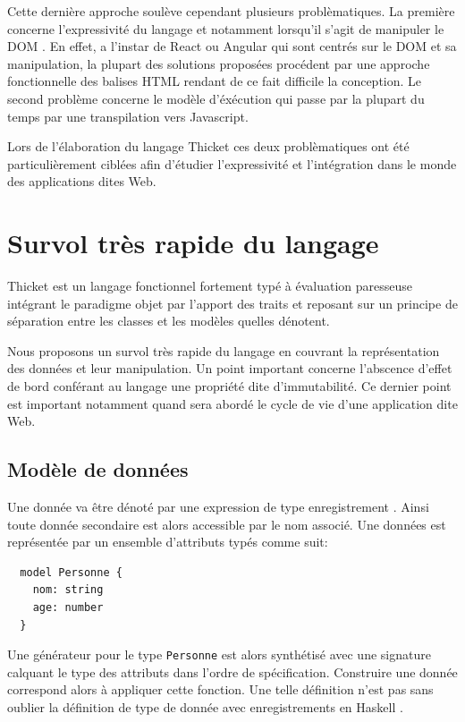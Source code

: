 \documentclass[twoside,a4paper]{article}
\begin{document}
Cette dernière approche soulève cependant plusieurs problèmatiques. La
première  concerne l'expressivité  du langage  et notamment  lorsqu'il
s'agit de manipuler  le DOM \cite{dom}. En effet, a  l'instar de React
\cite{reacjs} ou Angular  \cite{angular2} qui sont centrés  sur le DOM
et sa manipulation,  la plupart des solutions  proposées procédent par
une  approche  fonctionnelle  des  balises HTML  rendant  de  ce  fait
difficile  la  conception.  Le  second  problème  concerne  le  modèle
d'éxécution qui  passe par la  plupart du temps par  une transpilation
vers Javascript.

Lors de l'élaboration  du langage Thicket ces  deux problèmatiques ont
été   particulièrement  ciblées   afin  d'étudier   l'expressivité  et
l'intégration dans le monde des applications dites Web.

\section{Survol très rapide du langage}

Thicket  est  un  langage  fonctionnel  fortement  typé  à  évaluation
paresseuse  intégrant  le  paradigme  objet par  l'apport  des  traits
\cite{trait}  et reposant  sur  un principe  de  séparation entre  les
classes et les modèles quelles dénotent.

Nous  proposons  un survol  très  rapide  du  langage en  couvrant  la
représentation des  données et  leur manipulation. Un  point important
concerne l'abscence d'effet de bord conférant au langage une propriété
dite d'immutabilité.  Ce dernier  point est important  notamment quand
sera abordé le cycle de vie d'une application dite Web.

\subsection{Modèle de données}

Une donnée  va être dénoté  par une expression de  type enregistrement
\cite{recordcalculus}.   Ainsi  toute   donnée  secondaire  est  alors
accessible  par le  nom associé.  Une données  est représentée  par un
ensemble d'attributs typés comme suit:

\lstset{language=Thicket}
\begin{lstlisting}
  model Personne {  
    nom: string   
    age: number
  }
\end{lstlisting}

Une générateur pour  le type {\tt Personne} est  alors synthétisé avec
une  signature  calquant  le  type   des  attributs  dans  l'ordre  de
spécification.   Construire une  donnée correspond  alors à  appliquer
cette  fonction.  Une  telle  définition n'est  pas  sans  oublier  la
définition  de   type  de  donnée  avec   enregistrements  en  Haskell
\cite{haskell}.
\end{document}
